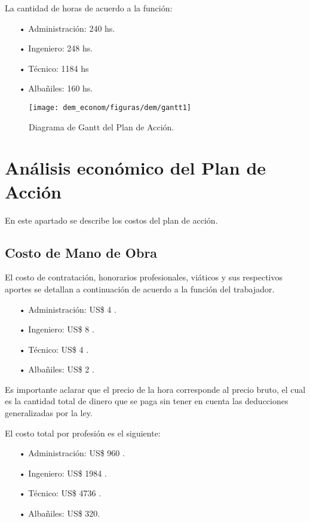 La cantidad de horas de acuerdo a la función:



\begin{itemize}


\item[•] Administración: 240 hs.
\item[•] Ingeniero: 248 hs.
\item[•]Técnico: 1184 hs
\item[•]Albañiles: 160 hs.

\end{itemize}

\begin{figure}[H]
	\centering
	\texttt{[image: dem\_econom/figuras/dem/gantt1]}
	\caption{Diagrama de Gantt del Plan de Acción.}
	\label{dem-figuras:gantt1}
\end{figure}





\section{Análisis económico del Plan de Acción}
 En este apartado se describe los costos del plan de acción.
\subsection{Costo de Mano de Obra}
El costo de contratación, honorarios profesionales, viáticos y sus respectivos aportes  se detallan a continuación de acuerdo a la función del trabajador.

\begin{itemize}


\item[•] Administración: US\$ 4 \cite{costo4}.
\item[•] Ingeniero: US\$ 8 \cite{costo1}.
\item[•]Técnico: US\$ 4 \cite{costo3}.
\item[•]Albañiles: US\$ 2 \cite{costo2}.

\end{itemize}

Es importante aclarar que el precio de la hora corresponde al precio bruto, el cual es la cantidad total de dinero que se paga sin tener en cuenta las deducciones generalizadas por la ley.

El costo total por profesión es el siguiente:


\begin{itemize}


\item[•] Administración: US\$ 960 \cite{costo4}.%
\item[•] Ingeniero: US\$ 1984 \cite{costo1}.
\item[•]Técnico: US\$ 4736 \cite{costo2}.
\item[•]Albañiles: US\$ 320\cite{costo3}.



\end{itemize}


